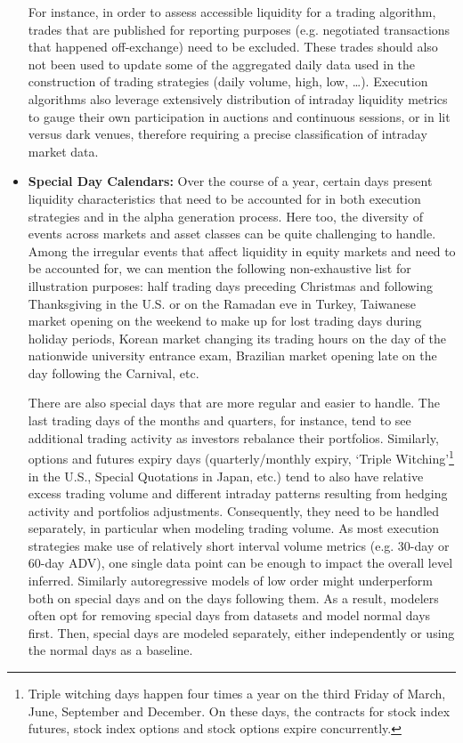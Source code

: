 \begin{itemize}
For instance, in order to assess accessible liquidity for a trading algorithm, trades that are published for reporting purposes (e.g. negotiated transactions that happened off-exchange) need to be excluded. These trades should also not been used to update some of the aggregated daily data used in the construction of trading strategies (daily volume, high, low, \dots). Execution algorithms also leverage extensively distribution of intraday liquidity metrics to gauge their own participation in auctions and continuous sessions, or in lit versus dark venues, therefore requiring a precise classification of intraday market data. 


\item \textbf{Special Day Calendars:} Over the course of a year, certain days present liquidity characteristics that need to be accounted for in both execution strategies and in the alpha generation process. Here too, the diversity of events across markets and asset classes can be quite challenging to handle. Among the irregular events that affect liquidity in equity markets and need to be accounted for, we can mention the following non-exhaustive list for illustration purposes: half trading days preceding Christmas and following Thanksgiving in the U.S. or on the Ramadan eve in Turkey, Taiwanese market opening on the weekend to make up for lost trading days during holiday periods, Korean market changing its trading hours on the day of the nationwide university entrance exam, Brazilian market opening late on the day following the Carnival, etc.

There are also special days that are more regular and easier to handle. The last trading days of the months and quarters, for instance, tend to see additional trading activity as investors rebalance their portfolios. Similarly, options and futures expiry days (quarterly/monthly expiry, `Triple Witching'\footnote{Triple witching days happen four times a year on the third Friday of March, June, September and December. On these days, the contracts for stock index futures, stock index options and stock options expire concurrently.} in the U.S., Special Quotations in Japan, etc.) tend to also have relative excess trading volume and different intraday patterns resulting from hedging activity and portfolios adjustments. Consequently, they need to be handled separately, in particular when modeling trading volume. As most execution strategies make use of relatively short interval volume metrics (e.g. 30-day or 60-day ADV), one single data point can be enough to impact the overall level inferred. Similarly autoregressive models of low order might underperform both on special days and on the days following them. As a result, modelers often opt for removing special days from datasets and model normal days first. Then, special days are modeled separately, either independently or using the normal days as a baseline. 


\end{itemize}
